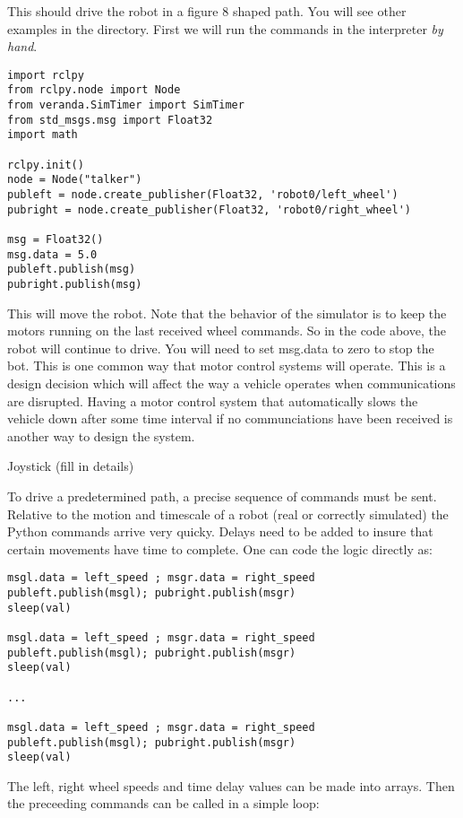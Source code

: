 This should drive the robot in a figure 8 shaped path. You will see
other examples in the directory. First we will run the commands in the
interpreter \emph{by hand}.

\begin{verbatim}
import rclpy
from rclpy.node import Node
from veranda.SimTimer import SimTimer
from std_msgs.msg import Float32
import math

rclpy.init()
node = Node("talker")
publeft = node.create_publisher(Float32, 'robot0/left_wheel')
pubright = node.create_publisher(Float32, 'robot0/right_wheel')

msg = Float32()
msg.data = 5.0
publeft.publish(msg)
pubright.publish(msg)
\end{verbatim}

This will move the robot. Note that the behavior of the simulator is to
keep the motors running on the last received wheel commands. So in the
code above, the robot will continue to drive. You will need to set
msg.data to zero to stop the bot. This is one common way that motor
control systems will operate. This is a design decision which will
affect the way a vehicle operates when communications are disrupted.
Having a motor control system that automatically slows the vehicle down
after some time interval if no communciations have been received is
another way to design the system.

Joystick (fill in details)

To drive a predetermined path, a precise sequence of commands must be
sent. Relative to the motion and timescale of a robot (real or correctly
simulated) the Python commands arrive very quicky. Delays need to be
added to insure that certain movements have time to complete. One can
code the logic directly as:

\begin{verbatim}
msgl.data = left_speed ; msgr.data = right_speed
publeft.publish(msgl); pubright.publish(msgr)
sleep(val)

msgl.data = left_speed ; msgr.data = right_speed
publeft.publish(msgl); pubright.publish(msgr)
sleep(val)

...

msgl.data = left_speed ; msgr.data = right_speed
publeft.publish(msgl); pubright.publish(msgr)
sleep(val)
\end{verbatim}

The left, right wheel speeds and time delay values can be made into
arrays. Then the preceeding commands can be called in a simple loop:

